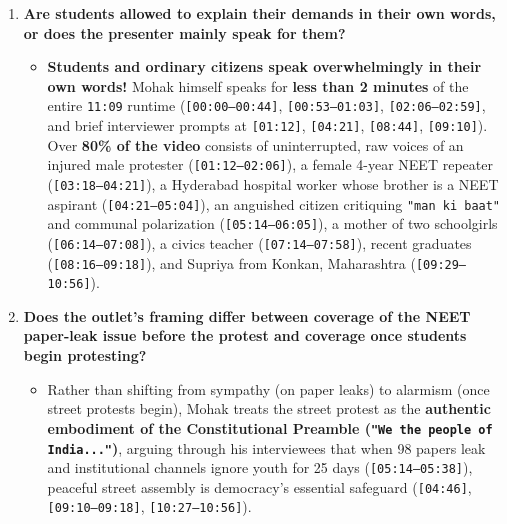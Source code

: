\documentclass[10pt,a4paper]{article}
\begin{document}
\begin{enumerate}[leftmargin=1.6em, itemsep=4pt, topsep=4pt]
\begin{itemize}[leftmargin=1.4em, itemsep=2pt, topsep=2pt]
  \end{itemize}
  \item \textbf{Are students allowed to explain their demands in their own words, or does the presenter mainly speak for them?}
  \begin{itemize}[leftmargin=1.4em, itemsep=2pt, topsep=2pt]
    \item \textbf{Students and ordinary citizens speak overwhelmingly in their own words!} Mohak himself speaks for \textbf{less than 2 minutes} of the entire \texttt{11:09} runtime (\texttt{[00:00--00:44]}, \texttt{[00:53--01:03]}, \texttt{[02:06--02:59]}, and brief interviewer prompts at \texttt{[01:12]}, \texttt{[04:21]}, \texttt{[08:44]}, \texttt{[09:10]}). Over \textbf{80\% of the video} consists of uninterrupted, raw voices of an injured male protester (\texttt{[01:12--02:06]}), a female 4-year NEET repeater (\texttt{[03:18--04:21]}), a Hyderabad hospital worker whose brother is a NEET aspirant (\texttt{[04:21--05:04]}), an anguished citizen critiquing \texttt{"man ki baat"} and communal polarization (\texttt{[05:14--06:05]}), a mother of two schoolgirls (\texttt{[06:14--07:08]}), a civics teacher (\texttt{[07:14--07:58]}), recent graduates (\texttt{[08:16--09:18]}), and Supriya from Konkan, Maharashtra (\texttt{[09:29--10:56]}).
  \end{itemize}
  \item \textbf{Does the outlet's framing differ between coverage of the NEET paper-leak issue before the protest and coverage once students begin protesting?}
  \begin{itemize}[leftmargin=1.4em, itemsep=2pt, topsep=2pt]
    \item Rather than shifting from sympathy (on paper leaks) to alarmism (once street protests begin), Mohak treats the street protest as the \textbf{authentic embodiment of the Constitutional Preamble (\texttt{"We the people of India..."})}, arguing through his interviewees that when 98 papers leak and institutional channels ignore youth for 25 days (\texttt{[05:14--05:38]}), peaceful street assembly is democracy's essential safeguard (\texttt{[04:46]}, \texttt{[09:10--09:18]}, \texttt{[10:27--10:56]}).
  \end{itemize}
\end{enumerate}
\end{document}
